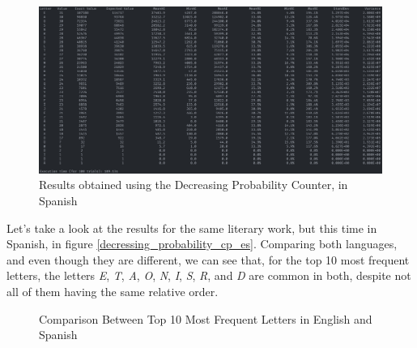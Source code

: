 \documentclass[...]{revdetua}
\begin{document}
\begin{figure}[!htb]
    \centering
    \includegraphics[width=1\columnwidth]{./figures/decressing_probability_cp_es.png}
    \caption{Results obtained using the Decreasing Probability Counter, in Spanish\label{decressing_probability_cp_es}}
    \label{fig: decressing_probability_cp_es}
\end{figure}

Let's take a look at the results for the same literary work, but this time in Spanish, in figure \ref{decressing_probability_cp_es}. Comparing both languages, and even though they are different, we can see that, for the top 10 most frequent letters, the letters \textit{E}, \textit{T}, \textit{A}, \textit{O}, \textit{N}, \textit{I}, \textit{S}, \textit{R}, and \textit{D} are common in both, despite not all of them having the same relative order.

\begin{figure}[!htb]
    \centering
    \qquad
    \caption{Comparison Between Top 10 Most Frequent Letters in English and Spanish\label{comparison_top10}}%
    \label{fig:example}%
\end{figure}
\end{document}
